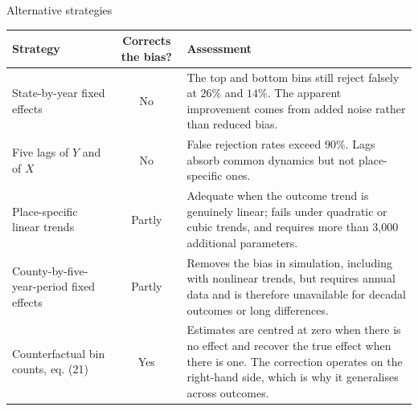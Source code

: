 \documentclass[aspectratio=169,10pt]{beamer}
\begin{document}
\begin{frame}{Alternative strategies}
  
  \centering
  \footnotesize
  \begin{tabular}{@{}L{0.38\textwidth}cL{0.42\textwidth}@{}}
    \toprule
    \textbf{Strategy} & \textbf{Corrects the bias?} & \textbf{Assessment} \\
    \midrule
    State-by-year fixed effects & \color{climred}No
      & The top and bottom bins still reject falsely at $26\%$ and $14\%$. The
        apparent improvement comes from added noise rather than reduced bias. \\[3pt]
    Five lags of $Y$ and of $X$ & \color{climred}No
      & False rejection rates exceed $90\%$. Lags absorb common dynamics but not
        place-specific ones. \\[3pt]
    Place-specific linear trends & \color{climorange}Partly
      & Adequate when the outcome trend is genuinely linear; fails under quadratic or
        cubic trends, and requires more than 3{,}000 additional parameters. \\[3pt]
    County-by-five-year-period fixed effects & \color{climorange}Partly
      & Removes the bias in simulation, including with nonlinear trends, but requires
        annual data and is therefore unavailable for decadal outcomes or long
        differences. \\[3pt]
    Counterfactual bin counts, eq. (21) & \color{climteal}Yes
      & Estimates are centred at zero when there is no effect and recover the true
        effect when there is one. The correction operates on the right-hand side,
        which is why it generalises across outcomes. \\
    \bottomrule
  \end{tabular}
\end{frame}
\end{document}
